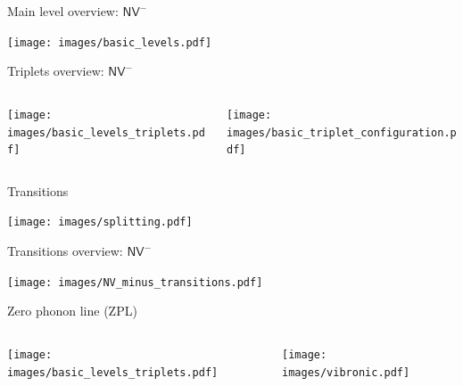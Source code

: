 \documentclass[]{beamer}
\begin{document}
\begin{frame}{Main level overview: $ \mathsf{NV}^{-} $ }
  \begin{center}
    \texttt{[image: images/basic\_levels.pdf]}
  \end{center}
\end{frame}

\begin{frame}{Triplets overview: $ \mathsf{NV}^{-} $ }
  \begin{center}
    \begin{columns}
      \begin{column}{0.5\textwidth}
        \centering
        \texttt{[image: images/basic\_levels\_triplets.pdf]}
      \end{column}
      \begin{column}{0.5\textwidth}
        \centering
        \texttt{[image: images/basic\_triplet\_configuration.pdf]}
      \end{column}
    \end{columns}
  \end{center}
\end{frame}

\begin{frame}{Transitions}
  \begin{center}
    \texttt{[image: images/splitting.pdf]}
  \end{center}
\end{frame}

\begin{frame}{Transitions overview: $ \mathsf{NV}^{-} $ }
  \begin{center}
    \texttt{[image: images/NV\_minus\_transitions.pdf]}
  \end{center}
\end{frame}


\begin{frame}{Zero phonon line (ZPL)}
  \begin{columns}
    \begin{column}{0.5\textwidth}
    \texttt{[image: images/basic\_levels\_triplets.pdf]}
    \end{column}
    \begin{column}{0.5\textwidth}
    \texttt{[image: images/vibronic.pdf]}
    \end{column}
  \end{columns}
\end{frame}
\end{document}
